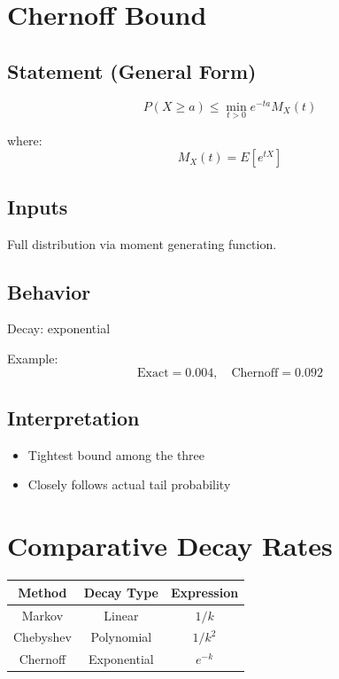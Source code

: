 \documentclass[11pt]{article}
\begin{document}
\section{Chernoff Bound}

\subsection{Statement (General Form)}

\[
P(X \ge a) \le \min_{t>0} e^{-ta} M_X(t)
\]

where:
\[
M_X(t) = E[e^{tX}]
\]

\subsection{Inputs}

Full distribution via moment generating function.

\subsection{Behavior}

Decay: exponential

Example:
\[
\text{Exact} = 0.004,\quad \text{Chernoff} = 0.092
\]

\subsection{Interpretation}

\begin{itemize}[noitemsep]
\item Tightest bound among the three
\item Closely follows actual tail probability
\end{itemize}

\section{Comparative Decay Rates}

\begin{center}
\begin{tabular}{c|c|c}
Method & Decay Type & Expression \\ \hline
Markov & Linear & $1/k$ \\
Chebyshev & Polynomial & $1/k^2$ \\
Chernoff & Exponential & $e^{-k}$
\end{tabular}
\end{center}
\end{document}
